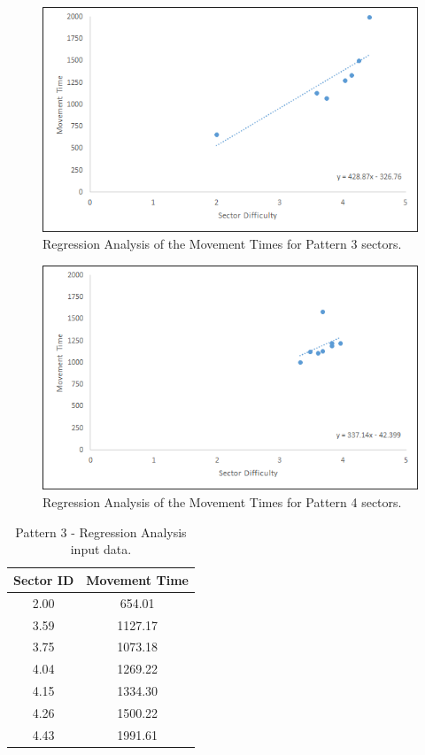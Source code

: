 			\begin{figure}[]
				\centering
				\includegraphics[width = \textwidth]{../images/pat_3_reg}
				\caption{Regression Analysis of the Movement Times for Pattern 3 sectors.}
				\label{fig_pat_3_reg}
			\end{figure}
		
			\begin{figure}[]
				\centering
				\includegraphics[width = \textwidth]{../images/pat_4_reg}
				\caption{Regression Analysis of the Movement Times for Pattern 4 sectors.}
				\label{fig_pat_4_reg}
			\end{figure}
			
			\begin{table}[]
				\centering
				\caption{Pattern 3 - Regression Analysis input data.}
				\label{tab_pat_3_reg}
				\begin{tabular}{|c|c|}
					\hline
					\textbf{Sector ID} & \textbf{Movement Time} \\ \hline
					2.00               & 654.01                 \\ \hline
					3.59               & 1127.17                \\ \hline
					3.75               & 1073.18                \\ \hline
					4.04               & 1269.22                \\ \hline
					4.15               & 1334.30                \\ \hline
					4.26               & 1500.22                \\ \hline
					4.43               & 1991.61                \\ \hline
				\end{tabular}
			\end{table}
			
